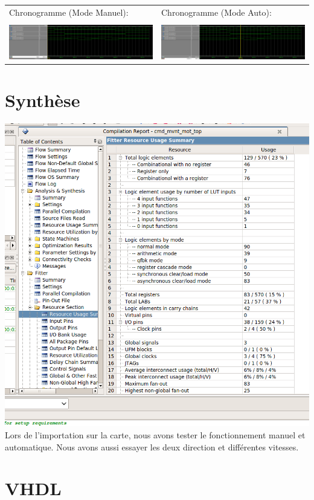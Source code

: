 \documentclass[10pt,a4paper]{article}
\begin{document}
\begin{tabular}{ll}

Chronogramme (Mode Manuel): & Chronogramme (Mode Auto):\\\\
\includegraphics[angle=90,scale=0.45]{images/manualSim.jpg} & \includegraphics[angle=90,scale=0.45]{images/autoSim.jpg}\\

\end{tabular}
\newpage
\section{Synthèse}
\includegraphics[scale=0.45]{images/summaryQuartus.png}\\

Lors de l'importation sur la carte, nous avons tester le fonctionnement manuel et automatique. Nous avons aussi essayer les deux direction et différentes vitesses.

\newpage
\section{VHDL}
\end{document}
